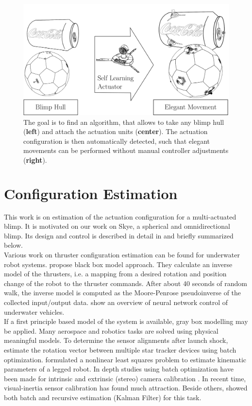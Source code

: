 \begin{figure}[hbtp]
\centering
\includegraphics[width=.85\linewidth]{images/motivation.png}
\caption{The goal is to find an algorithm, that allows to take any blimp hull (\textbf{left}) and attach the actuation units (\textbf{center}).
The actuation configuration is then automatically detected, such that elegant movements can be performed without manual controller adjustments (\textbf{right}).}
\label{fig:motivation}
\end{figure}

\section{Configuration Estimation}
\label{sec:configuration_estimation}
This work is on estimation of the actuation configuration for a multi-actuated blimp.
It is motivated on our work on Skye, a spherical and omnidirectional blimp.
Its design and control is described in detail in \citep{Skye2013} and briefly summarized below. \\
Various work on thruster configuration estimation can be found for underwater robot systems.
 propose black box model approach.
They calculate an inverse model of the thrusters, i.e. a mapping from a desired rotation and position change of the robot to the thruster commands. After about 40 seconds of random walk, the inverse model is computed as the Moore-Penrose pseudoinverse of the collected input/output data.
 show an overview of neural network control of underwater vehicles. \\ 
If a first principle based model of the system is available, gray box modelling may be applied.
Many aerospace and robotics tasks are solved using physical meaningful models.
To determine the sensor alignments after launch shock, \citet{Shuster1991} estimate the rotation vector between multiple star tracker devices using batch optimization.
 formulated a nonlinear least squares problem to estimate kinematic parameters of a legged robot.
In depth studies using batch optimization have been made for intrinsic and extrinsic (stereo) camera calibration \citep[chap. 4]{Siegwart}.
In recent time, visual-inertia sensor calibration has found much attraction.
Beside others, \citet{Hol2011} showed both batch and recursive estimation (Kalman Filter) for this task.

